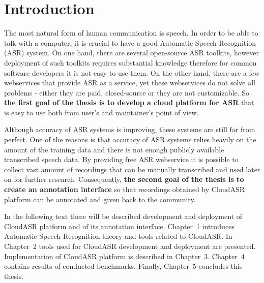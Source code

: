 \chapter*{Introduction}

The most natural form of human communication is speech.
In order to be able to talk with a computer,
  it is crucial to have a good Automatic Speech Recognition (ASR) system.
On one hand, there are several open-source ASR toolkits,
  however deployment of such toolkits requires substantial knowledge therefore
  for common software developers it is not easy to use them.
On the other hand, there are a few webservices that provide ASR as a service,
  yet these webservices do not solve all problems -
  either they are paid, closed-source or they are not customizable.
So \textbf{the first goal of the thesis is to develop a cloud platform for ASR}
  that is easy to use both from user's and maintainer's point of view.

Although accuracy of ASR systems is improving,
  these systems are still far from perfect.
One of the reasons is that accuracy of ASR systems relies heavily on the amount of the training data
  and there is not enough publicly available transcribed speech data.
By providing free ASR webservice it is possible to collect vast amount of recordings
  that can be manually transcribed and used later on for further research.
Consequently, \textbf{the second goal of the thesis is to create an annotation interface}
  so that recordings obtained by CloudASR platform can be annotated and given back to the community.

In the following text there will be described development and deployment of CloudASR platform and of its annotation interface.
Chapter~1 introduces Automatic Speech Recognition theory and tools related to CloudASR.
In Chapter~2 tools used for CloudASR development and deployment are presented.
Implementation of CloudASR platform is described in Chapter~3.
Chapter~4 contains results of conducted benchmarks.
Finally, Chapter~5 concludes this thesis.
